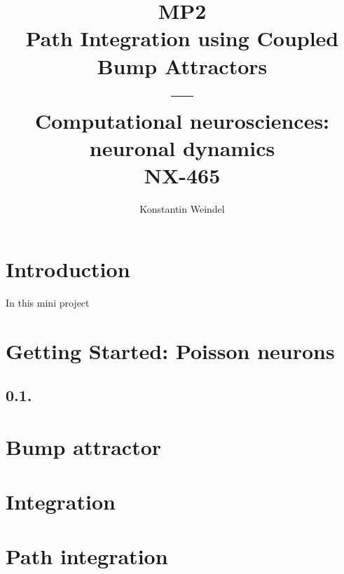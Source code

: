 \documentclass{article}
\title{MP2\\Path Integration using Coupled Bump Attractors\\---\\Computational neurosciences: neuronal dynamics\\NX-465}
\author{Konstantin Weindel}
\begin{document}
\maketitle


\section*{Introduction}
In this mini project 

\section{Getting Started: Poisson neurons}
\subsection*{0.1.}


\section{Bump attractor}

\section{Integration}

\section{Path integration}
\end{document}
